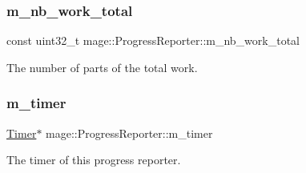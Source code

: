 \subsubsection{\texorpdfstring{m\+\_\+nb\+\_\+work\+\_\+total}{m\_nb\_work\_total}}
{\footnotesize\ttfamily const uint32\+\_\+t mage\+::\+Progress\+Reporter\+::m\+\_\+nb\+\_\+work\+\_\+total\hspace{0.3cm}{\ttfamily [protected]}}

The number of parts of the total work. \hypertarget{classmage_1_1_progress_reporter_aaca483b46968f0d39262305b5400a3e1}{}\label{classmage_1_1_progress_reporter_aaca483b46968f0d39262305b5400a3e1} 
\subsubsection{\texorpdfstring{m\+\_\+timer}{m\_timer}}
{\footnotesize\ttfamily \hyperlink{classmage_1_1_timer}{Timer}$\ast$ mage\+::\+Progress\+Reporter\+::m\+\_\+timer\hspace{0.3cm}{\ttfamily [protected]}}

The timer of this progress reporter. 